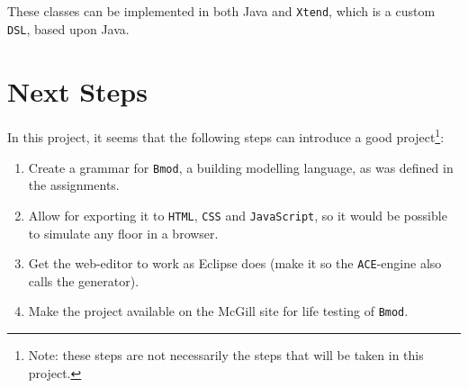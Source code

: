 \documentclass[review]{elsarticle}
\begin{document}
These classes can be implemented in both \textsf{Java} and \texttt{Xtend}, which is a custom \texttt{DSL}, based upon \textsf{Java}.

\section{Next Steps}
\label{sec:next}
In this project, it seems that the following steps can introduce a good project\footnote{Note: these steps are not necessarily the steps that will be taken in this project.}:
\begin{enumerate}
	\item Create a grammar for \texttt{Bmod}, a building modelling language, as was defined in the assignments.
	\item Allow for exporting it to \texttt{HTML}, \texttt{CSS} and \texttt{JavaScript}, so it would be possible to simulate any floor in a browser.
	\item Get the web-editor to work as \textsf{Eclipse} does (make it so the \texttt{ACE}-engine also calls the generator).
	\item Make the project available on the McGill site for life testing of \texttt{Bmod}.
\end{enumerate}


\end{document}
